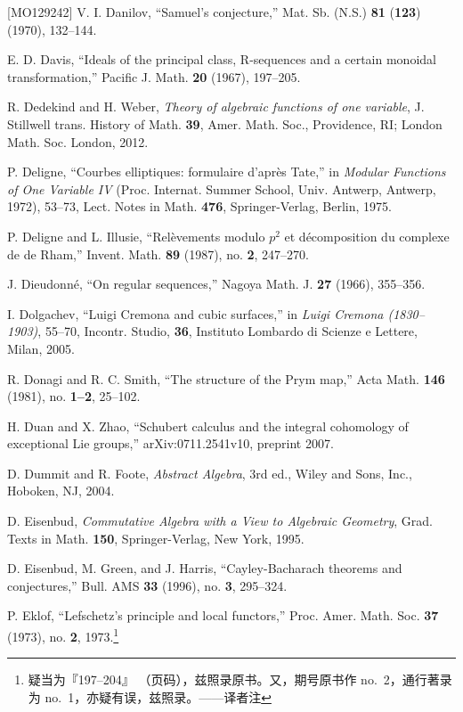 \begin{thebibliography}{[MO129242]}
V. I. Danilov, ``Samuel's conjecture,'' Mat. Sb. (N.S.) \textbf{81}
(\textbf{123}) (1970), 132--144.

E. D. Davis, ``Ideals of the principal class, R-sequences and a certain
monoidal transformation,'' Pacific J. Math. \textbf{20} (1967), 197--205.

R. Dedekind and H. Weber, \emph{Theory of algebraic functions of one
variable}, J. Stillwell trans. History of Math. \textbf{39}, Amer. Math.
Soc., Providence, RI; London Math. Soc. London, 2012.

P. Deligne, ``Courbes elliptiques: formulaire d'après Tate,'' in \emph{Modular
Functions of One Variable IV} (Proc. Internat. Summer School, Univ. Antwerp,
Antwerp, 1972), 53--73, Lect. Notes in Math. \textbf{476}, Springer-Verlag,
Berlin, 1975.

P. Deligne and L. Illusie, ``Relèvements modulo $p^2$ et décomposition du
complexe de de Rham,'' Invent. Math. \textbf{89} (1987), no. \textbf{2},
247--270.

J. Dieudonné, ``On regular sequences,'' Nagoya Math. J. \textbf{27} (1966),
355--356.

I. Dolgachev, ``Luigi Cremona and cubic surfaces,'' in \emph{Luigi Cremona
(1830--1903)}, 55--70, Incontr. Studio, \textbf{36}, Instituto Lombardo di
Scienze e Lettere, Milan, 2005.

R. Donagi and R. C. Smith, ``The structure of the Prym map,'' Acta Math.
\textbf{146} (1981), no. \textbf{1--2}, 25--102.

H. Duan and X. Zhao, ``Schubert calculus and the integral cohomology of
exceptional Lie groups,'' arXiv:0711.2541v10, preprint 2007.

D. Dummit and R. Foote, \emph{Abstract Algebra}, 3rd ed., Wiley and Sons,
Inc., Hoboken, NJ, 2004.

D. Eisenbud, \emph{Commutative Algebra with a View to Algebraic Geometry},
Grad. Texts in Math. \textbf{150}, Springer-Verlag, New York, 1995.

D. Eisenbud, M. Green, and J. Harris, ``Cayley-Bacharach theorems and
conjectures,'' Bull. AMS \textbf{33} (1996), no. \textbf{3}, 295--324.

P. Eklof, ``Lefschetz's principle and local functors,'' Proc. Amer. Math.
Soc. \textbf{37} (1973), no. \textbf{2}, 1973.\footnote{疑当为『197--204』
（页码），兹照录原书。又，期号原书作 no.~2，通行著录为 no.~1，亦疑有误，兹照录。——译者注}


\end{thebibliography}
